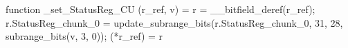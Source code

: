 function _set_StatusReg_CU (r_ref, v) = {
    r = __bitfield_deref(r_ref);
    r.StatusReg_chunk_0 = update_subrange_bits(r.StatusReg_chunk_0, 31, 28, subrange_bits(v, 3, 0));
    (*r_ref) = r
}
